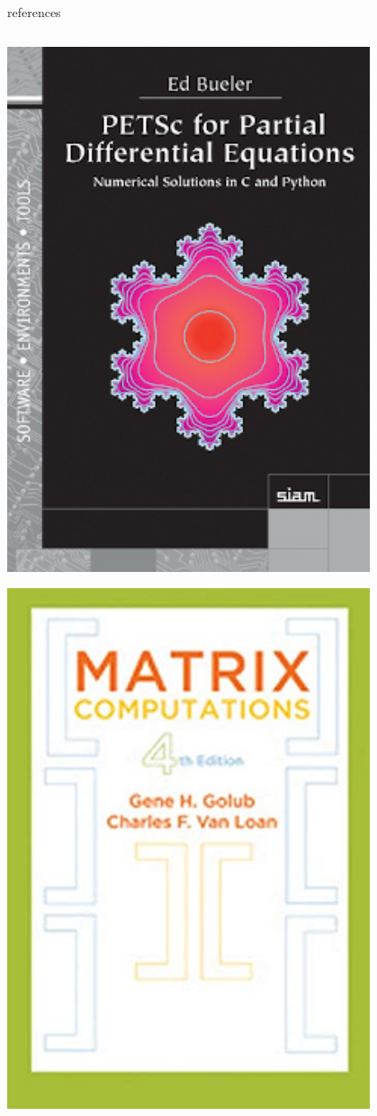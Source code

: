 \documentclass[10pt,
               svgnames,
               hyperref={colorlinks,citecolor=DeepPink4,linkcolor=FireBrick,urlcolor=Maroon},
               usepdftitle=false]{beamer}
\begin{document}
\begin{frame}{references}
\begin{columns}
\begin{column}{0.17\textwidth}
\hfill \includegraphics[width=0.8\textwidth]{images/bueler.jpg}

\medskip
\hfill \includegraphics[width=0.8\textwidth]{images/golubvanloan.jpg}


\end{column}
\end{columns}
\end{frame}
\end{document}
